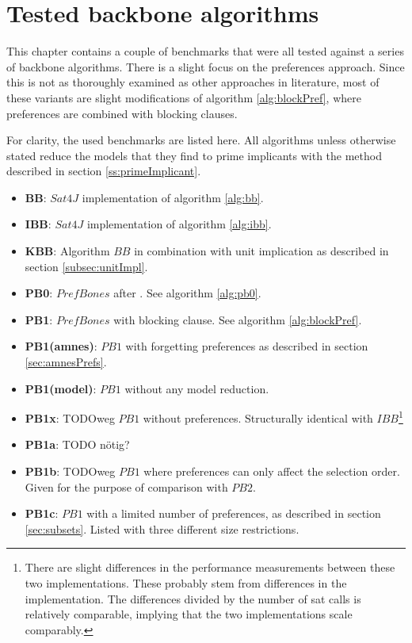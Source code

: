 \section{Tested backbone algorithms}

This chapter contains a couple of benchmarks that were all tested against a series of backbone algorithms. There is a slight focus on the preferences approach. Since this is not as thoroughly examined as other approaches in literature, most of these variants are slight modifications of algorithm \ref{alg:blockPref}, where preferences are combined with blocking clauses.

For clarity, the used benchmarks are listed here. All algorithms unless otherwise stated reduce the models that they find to prime implicants with the method described in section \ref{ss:primeImplicant}.
\begin{itemize}
\item \textbf{BB}: $Sat4J$ implementation of algorithm \ref{alg:bb}.
\item \textbf{IBB}: $Sat4J$ implementation of algorithm \ref{alg:ibb}.
\item \textbf{KBB}: Algorithm $BB$ in combination with unit implication as described in section \ref{subsec:unitImpl}. 
\item \textbf{PB0}: $PrefBones$ after \cite{PJ18}. See algorithm \ref{alg:pb0}.
\item \textbf{PB1}: $PrefBones$ with blocking clause. See algorithm \ref{alg:blockPref}.
\item \textbf{PB1(amnes)}: $PB1$ with forgetting preferences as described in section \ref{sec:amnesPrefs}.
\item \textbf{PB1(model)}: $PB1$ without any model reduction.
\item \textbf{PB1x}: TODOweg $PB1$ without preferences. Structurally identical with $IBB$\footnote{There are slight differences in the performance measurements between these two implementations. These probably stem from differences in the implementation. The differences divided by the number of sat calls is relatively comparable, implying that the two implementations scale comparably.}
\item \textbf{PB1a}: TODO nötig?
\item \textbf{PB1b}: TODOweg $PB1$ where preferences can only affect the selection order. Given for the purpose of comparison with $PB2$.
\item \textbf{PB1c}: $PB1$ with a limited number of preferences, as described in section \ref{sec:subsets}. Listed with three different size restrictions.

\end{itemize}
